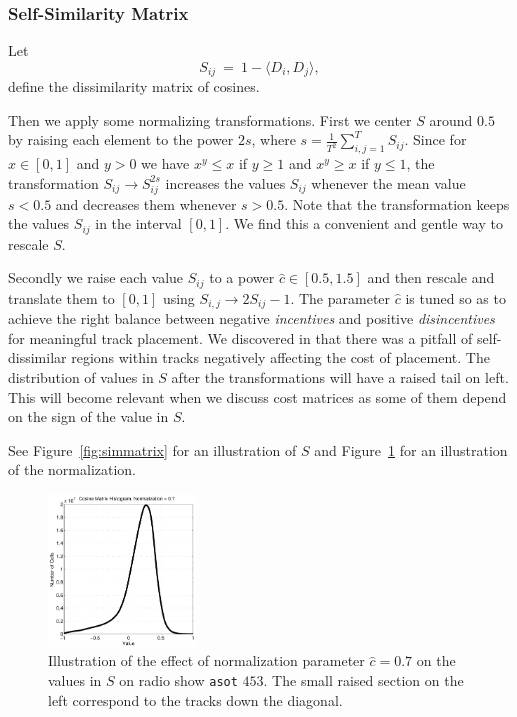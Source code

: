 \documentclass[twocolumn]{article}
\begin{document}
		\subsubsection{Self-Similarity Matrix}\label{sec:self-similarity}
	
	Let
	\[
	S_{ij} ~=~ 1-\langle D_{i}, D_{j}\rangle,
	\] define the dissimilarity matrix of cosines.
	
Then we apply some normalizing transformations. First we center $S$
around $0.5$ by raising each element to the power $2s$, where
$s=\frac{1}{T^2}\sum_{i,j=1}^TS_{ij}$. Since for $x\in [0,1]$ and
$y>0$ we have $x^y\le x$ if $y\ge 1$ and $x^y\ge x$ if $y\le 1$, the
transformation $S_{ij}\to S_{ij}^{2s}$ increases the values $S_{ij}$
whenever the mean value $s<0.5$ and decreases them whenever
$s>0.5$. Note that the transformation keeps the values $S_{ij}$ in the
interval $[0,1]$. We find this a convenient and gentle way to rescale
$S$.

Secondly we raise each value $S_{ij}$ to a power $\hat c \in
[0.5,1.5]$ and then rescale and translate them to $[0,1]$ using
$S_{i,j}\to 2S_{ij}-1$.  The parameter $\hat c$ is tuned so as to
achieve the right balance between negative \textit{incentives} and
positive \textit{disincentives} for meaningful track placement. We discovered in \citep{scarfe2013long}  that there was a pitfall of self-dissimilar regions within tracks negatively affecting the cost of placement. The distribution of values in $S$ after the transformations will have a
raised tail on left. This will become relevant when we discuss cost
matrices as some of them depend on the sign of the value in $S$.
	
	See Figure~\ref{fig:simmatrix} for an illustration of $S$ and Figure~\ref{fig:cosine_norm} for an illustration of the  normalization.
	
		\begin{figure}
			\centering
			\includegraphics[width=0.35\textwidth]{images/cosine_histogram}
			
			\caption{Illustration of the effect of normalization parameter $\hat c=0.7$ on the values in $S$ on radio show \texttt{asot} $453$. The small raised section on the left correspond to the tracks down the diagonal.}
			\label{fig:cosine_norm}
		\end{figure} 
	
\end{document}
